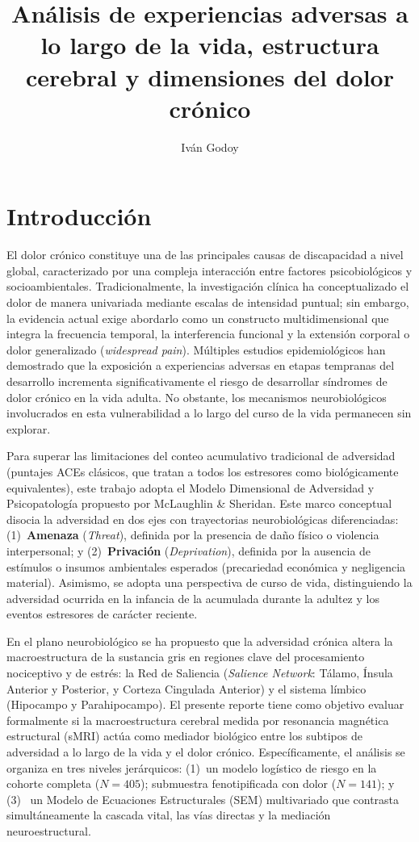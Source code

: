 \documentclass[11pt,a4paper]{article}
\title{Análisis de experiencias adversas a lo largo de la vida, estructura cerebral y dimensiones del dolor crónico}
\author{Iván Godoy}
\begin{document}
\maketitle

\section{Introducción}

El dolor crónico constituye una de las principales causas de discapacidad a nivel global, caracterizado por una compleja 
interacción entre factores psicobiológicos y socioambientales. Tradicionalmente, la investigación clínica ha conceptualizado
el dolor de manera univariada mediante escalas de intensidad puntual; sin embargo, la evidencia actual exige abordarlo como 
un constructo multidimensional que integra la frecuencia temporal, la interferencia funcional y la extensión corporal o 
dolor generalizado (\textit{widespread pain}). Múltiples estudios epidemiológicos han demostrado que la exposición a experiencias 
adversas en etapas tempranas del desarrollo incrementa significativamente el riesgo de desarrollar síndromes de dolor crónico 
en la vida adulta. No obstante, los mecanismos neurobiológicos involucrados en esta vulnerabilidad a lo largo del curso de la vida 
permanecen sin explorar. 

Para superar las limitaciones del conteo acumulativo tradicional de adversidad (puntajes ACEs clásicos, que tratan a todos los 
estresores como biológicamente equivalentes), este trabajo adopta el Modelo Dimensional de Adversidad y Psicopatología propuesto 
por McLaughlin \& Sheridan. Este marco conceptual disocia la adversidad en dos ejes con trayectorias neurobiológicas diferenciadas:
(1)~\textbf{Amenaza} (\textit{Threat}), definida por la presencia de daño físico o violencia interpersonal; y (2)~\textbf{Privación} (\textit{Deprivation}), definida por la ausencia de estímulos o insumos ambientales 
esperados (precariedad económica y negligencia material). Asimismo, se adopta una perspectiva de curso de vida, distinguiendo la adversidad
ocurrida en la infancia de la acumulada durante la adultez y los eventos estresores de carácter reciente. 

En el plano neurobiológico se ha propuesto que la adversidad crónica altera la macroestructura de la sustancia gris en regiones clave del 
procesamiento nociceptivo y de estrés: la Red de Saliencia (\textit{Salience Network}: Tálamo, Ínsula Anterior y Posterior, y Corteza Cingulada 
Anterior) y el sistema límbico (Hipocampo y Parahipocampo). El presente reporte tiene como objetivo evaluar formalmente si la macroestructura 
cerebral medida por resonancia magnética estructural (sMRI) actúa como mediador biológico entre los subtipos de adversidad a lo largo de la vida
y el dolor crónico. Específicamente, el análisis se organiza en tres niveles jerárquicos: (1)~un modelo logístico de riesgo en la cohorte completa ($N = 405$);
submuestra fenotipificada con dolor ($N =141$); y (3)~ un Modelo de Ecuaciones Estructurales (SEM) multivariado que contrasta simultáneamente la cascada vital,
las vías directas y la mediación neuroestructural. 
\end{document}
